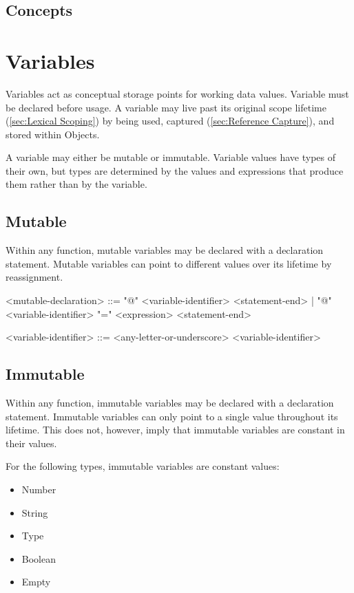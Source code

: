 \documentclass[12pt,letterpaper]{report}
\begin{document}
\section{Concepts}
\chapter{Variables}

Variables act as conceptual storage points for working data values. Variable must be declared before usage.
A variable may live past its original scope lifetime (\autoref{sec:Lexical Scoping}) by being used, captured (\autoref{sec:Reference Capture}), and stored within Objects.

A variable may either be mutable or immutable. Variable values have types of their own, but 
types are determined by the values and expressions that produce them rather than by the 
variable.

\section{Mutable}

Within any function, mutable variables may be declared with a declaration statement.
Mutable variables can point to different values over its lifetime by reassignment.

    <mutable-declaration> ::= "@" <variable-identifier> <statement-end> | "@" <variable-identifier> "=" <expression> <statement-end> 

    <variable-identifier> ::= <any-letter-or-underscore> <variable-identifier>
        




\section{Immutable}
Within any function, immutable variables may be declared with a declaration statement.
Immutable variables can only point to a single value throughout its lifetime. This does not, however,
imply that immutable variables are constant in their values. 

For the following types, immutable variables are constant values:
\begin{itemize}
  \item Number 
  \item String 
  \item Type
  \item Boolean
  \item Empty 
\end{itemize}
\end{document}
